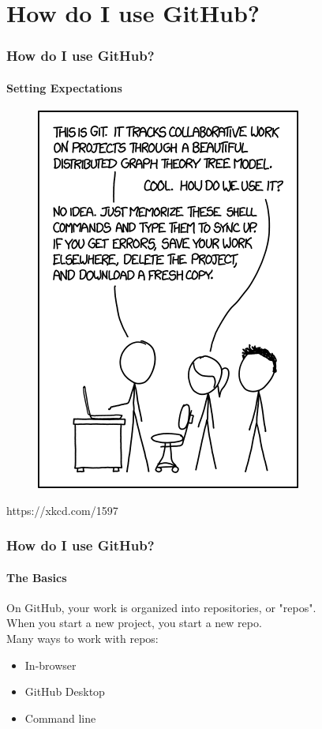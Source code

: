 \documentclass{beamer}
\begin{document}
\section{How do I use GitHub?} %

\begin{frame}
	\frametitle{How do I use GitHub?}
	\framesubtitle{Setting Expectations}
	\begin{figure}
		\label{https://xkcd.com/1597/}
		\centering
		\includegraphics[height=0.8\textheight]{xkcd-git}
	\end{figure}
\begin{flushright}
	\footnotesize{https://xkcd.com/1597}
\end{flushright}
\end{frame}

\begin{frame}
  \frametitle{How do I use GitHub?}
  \framesubtitle{The Basics}
  On GitHub, your work is organized into repositories, or "repos".\\\pause\vspace{0.25em}
  When you start a new project, you start a new repo.\\\pause\vspace{0.25em}
  Many ways to work with repos:
  \begin{itemize}[<+->]
    \item In-browser
    \item GitHub Desktop
    \item Command line
  \end{itemize}
\end{frame}
\end{document}
